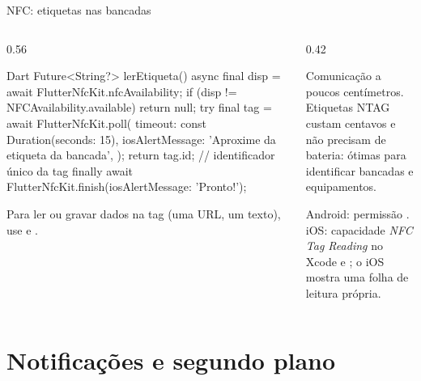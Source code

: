\documentclass[aspectratio=169,10pt]{beamer}
\begin{document}
\begin{frame}[fragile]{NFC: etiquetas nas bancadas}
  \begin{columns}[T]
    \begin{column}{0.56\textwidth}
\begin{codigo}[title=Check-in por aproximação (flutter\_nfc\_kit)]{Dart}
Future<String?> lerEtiqueta() async {
  final disp = await FlutterNfcKit.nfcAvailability;
  if (disp != NFCAvailability.available) return null;
  try {
    final tag = await FlutterNfcKit.poll(
      timeout: const Duration(seconds: 15),
      iosAlertMessage: 'Aproxime da etiqueta da bancada',
    );
    return tag.id;            // identificador único da tag
  } finally {
    await FlutterNfcKit.finish(iosAlertMessage: 'Pronto!');
  }
}
\end{codigo}
      \begin{dica}
        Para ler ou gravar dados na tag (uma URL, um texto), use  e .
      \end{dica}
    \end{column}
    \begin{column}{0.42\textwidth}
      \begin{conceito}[NFC]
        Comunicação a poucos centímetros. Etiquetas NTAG custam centavos e não precisam de bateria: ótimas para identificar bancadas e equipamentos.
      \end{conceito}
      \begin{atencao}[Configuração]
        Android: permissão . iOS: capacidade \emph{NFC Tag Reading} no Xcode e ; o iOS mostra uma folha de leitura própria.
      \end{atencao}
    \end{column}
  \end{columns}
\end{frame}

\section{Notificações e segundo plano}
\end{document}
